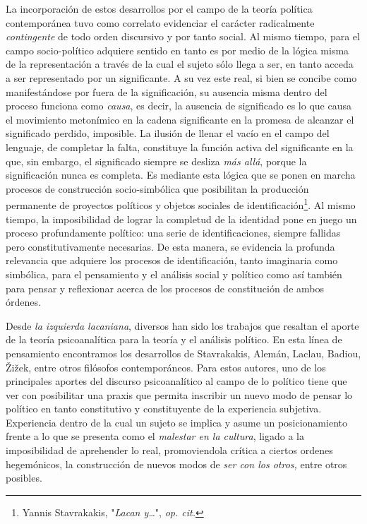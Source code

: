 \documentclass{book}
\begin{document}
La incorporación de estos desarrollos por el campo de la teoría política
contemporánea tuvo como correlato evidenciar el carácter radicalmente
\emph{contingente} de todo orden discursivo y por tanto social. Al mismo
tiempo, para el campo socio-político adquiere sentido en tanto es por
medio de la lógica misma de la representación a través de la cual el
sujeto sólo llega a ser, en tanto acceda a ser representado por un
significante. A su vez este real, si bien se concibe como manifestándose
por fuera de la significación, su ausencia misma dentro del proceso
funciona como \emph{causa}, es decir, la ausencia de significado es lo
que causa el movimiento metonímico en la cadena significante en la
promesa de alcanzar el significado perdido, imposible. La ilusión de
llenar el vacío en el campo del lenguaje, de completar la falta,
constituye la función activa del significante en la que, sin embargo, el
significado siempre se desliza \emph{más allá}, porque la significación
nunca es completa. Es mediante esta lógica que se ponen en marcha
procesos de construcción socio-simbólica que posibilitan la producción
permanente de proyectos políticos y objetos sociales de
identificación\footnote{Yannis Stavrakakis, "\emph{Lacan y\ldots{}}",
  \emph{op. cit.}}. Al mismo tiempo, la imposibilidad de lograr la
completud de la identidad pone en juego un proceso profundamente
político: una serie de identificaciones, siempre fallidas pero
constitutivamente necesarias. De esta manera, se evidencia la profunda
relevancia que adquiere los procesos de identificación, tanto imaginaria
como simbólica, para el pensamiento y el análisis social y político como
así también para pensar y reflexionar acerca de los procesos de
constitución de ambos órdenes.

Desde \emph{la izquierda lacaniana}, diversos han sido los trabajos que
resaltan el aporte de la teoría psicoanalítica para la teoría y el
análisis político. En esta línea de pensamiento encontramos los
desarrollos de Stavrakakis, Alemán, Laclau, Badiou, Žižek, entre otros
filósofos contemporáneos. Para estos autores, uno de los principales
aportes del discurso psicoanalítico al campo de lo político tiene que
ver con posibilitar una praxis que permita inscribir un nuevo modo de
pensar lo político en tanto constitutivo y constituyente de la
experiencia subjetiva. Experiencia dentro de la cual un sujeto se
implica y asume un posicionamiento frente a lo que se presenta como el
\emph{malestar en la cultura}, ligado a la imposibilidad de aprehender
lo real, promoviendola crítica a ciertos ordenes hegemónicos, la
construcción de nuevos modos de \emph{ser con los otros,} entre otros
posibles.
\end{document}

